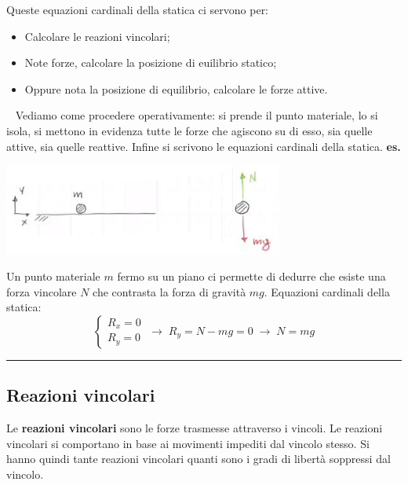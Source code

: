 Queste equazioni cardinali della statica ci servono per:
\begin{itemize}
    \item Calcolare le reazioni vincolari;
    \item Note forze, calcolare la posizione di euilibrio statico;
    \item Oppure nota la posizione di equilibrio, calcolare le forze attive.
\end{itemize}
\ \newline
Vediamo come procedere operativamente: si prende il punto materiale, lo si isola, si mettono in evidenza tutte le forze che agiscono su di esso, sia quelle attive, sia quelle reattive. Infine si scrivono le equazioni cardinali della statica.\newline
\newline
\textbf{es.} 
\begin{center}
    \includegraphics[height=3cm]{../lezione6/img1.JPG}
\end{center}
Un punto materiale $m$ fermo su un piano ci permette di dedurre che esiste una forza vincolare $N$ che contrasta la forza di gravità $mg$.\newline
\newline
Equazioni cardinali della statica:
\[
    \begin{cases}
        R_x = 0\\
        R_y = 0
    \end{cases} \; \rightarrow  \; R_y = N-mg = 0 \; \rightarrow  \; N = mg
\]
\rule{\textwidth}{0,4pt}
\newline
\subsection{Reazioni vincolari}
Le \textbf{reazioni vincolari} sono le forze trasmesse attraverso i vincoli.\newline
\newline
Le reazioni vincolari si comportano in base ai movimenti impediti dal vincolo stesso. Si hanno quindi tante reazioni vincolari quanti sono i gradi di libertà soppressi dal vincolo.
